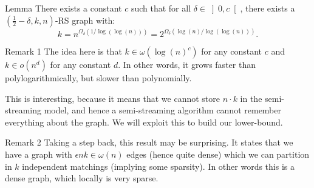 \documentclass[a4paper]{article}
\begin{document}
\begin{parag}{Lemma}
    There exists a constant $c$ such that for all $\delta \in \left]0, c\right[ $, there exists a $\left(\frac{1}{2} - \delta, k, n\right)$-RS graph with:
    \[k = n^{\Omega_{\delta}\left(1/\log\left(\log\left(n\right)\right)\right)}= 2^{\Omega_{\delta}\left(\log\left(n\right)/\log\left(\log\left(n\right)\right)\right)}.\]

    \begin{subparag}{Remark 1}
        The idea here is that $k \in \omega\left(\log\left(n\right)^c\right)$ for any constant $c$ and $k \in o\left(n^d\right)$ for any constant $d$. In other words, it grows faster than polylogarithmically, but slower than polynomially.

        This is interesting, because it means that we cannot store $n\cdot k$ in the semi-streaming model, and hence a semi-streaming algorithm cannot remember everything about the graph. We will exploit this to build our lower-bound.
    \end{subparag}

    \begin{subparag}{Remark 2}
        Taking a step back, this result may be surprising. It states that we have a graph with $\epsilon n k \in \omega\left(n\right)$ edges (hence quite dense) which we can partition in $k$ independent matchings (implying some sparsity). In other words this is a dense graph, which locally is very sparse.
    \end{subparag}
\end{parag}
\end{document}

